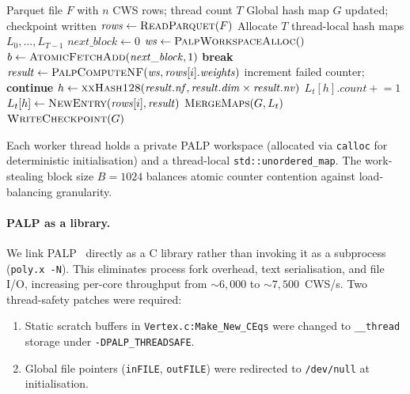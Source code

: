 \documentclass[12pt,a4paper]{article}
\theoremstyle{definition}
\begin{document}
\begin{algorithm}[t]
\caption{Per-file classification}
\label{alg:classify}
\begin{algorithmic}[1]
\Require Parquet file $F$ with $n$ CWS rows; thread count $T$
\Ensure Global hash map $G$ updated; checkpoint written
\State $\mathit{rows} \gets \textsc{ReadParquet}(F)$
\State Allocate $T$ thread-local hash maps $L_0, \ldots, L_{T-1}$
\State $\mathit{next\_block} \gets 0$
  \State $\mathit{ws} \gets \textsc{PalpWorkspaceAlloc}()$
  \Loop
    \State $b \gets \textsc{AtomicFetchAdd}(\mathit{next\_block}, 1)$
     \textbf{break} \EndIf
      \State $\mathit{result} \gets \textsc{PalpComputeNF}(\mathit{ws}, \mathit{rows}[i].\mathit{weights})$
       increment failed counter; \textbf{continue} \EndIf
      \State $h \gets \textsc{xxHash128}(\mathit{result.nf}, \mathit{result.dim} \times \mathit{result.nv})$
       $L_t[h].\mathit{count} \mathrel{+}= 1$
      \Else{} $L_t[h] \gets \textsc{NewEntry}(\mathit{rows}[i], \mathit{result})$
      \EndIf
    \EndFor
  \EndLoop
\EndFor
{}
  \State $\textsc{MergeMaps}(G, L_t)$
\EndFor
\State $\textsc{WriteCheckpoint}(G)$
\end{algorithmic}
\end{algorithm}

Each worker thread holds a private PALP workspace (allocated via
\texttt{calloc} for deterministic initialisation) and a thread-local
\texttt{std::unordered\_map}.  The work-stealing block size $B = 1024$
balances atomic counter contention against load-balancing granularity.

\paragraph{PALP as a library.}
We link PALP~\cite{PALP} directly as a C library rather than invoking it
as a subprocess (\texttt{poly.x -N}).  This eliminates process fork
overhead, text serialisation, and file I/O, increasing per-core
throughput from $\sim 6{,}000$ to $\sim 7{,}500$~CWS/s.  Two
thread-safety patches were required:
\begin{enumerate}
  \item Static scratch buffers in \texttt{Vertex.c:Make\_New\_CEqs} were
        changed to \texttt{\_\_thread} storage under
        \texttt{-DPALP\_THREADSAFE}.
  \item Global file pointers (\texttt{inFILE}, \texttt{outFILE}) were
        redirected to \texttt{/dev/null} at initialisation.
\end{enumerate}
\end{document}
